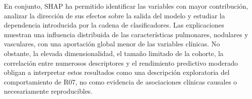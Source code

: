 En conjunto, SHAP ha permitido identificar las variables con mayor contribución, analizar la dirección de sus efectos sobre la salida del modelo y estudiar la dependencia introducida por la cadena de clasificadores. Las explicaciones muestran una influencia distribuida de las características pulmonares, nodulares y vasculares, con una aportación global menor de las variables clínicas. No obstante, la elevada dimensionalidad, el tamaño limitado de la cohorte, la correlación entre numerosos descriptores y el rendimiento predictivo moderado obligan a interpretar estos resultados como una descripción exploratoria del comportamiento de R07, no como evidencia de asociaciones clínicas causales o necesariamente reproducibles.

\endinput
